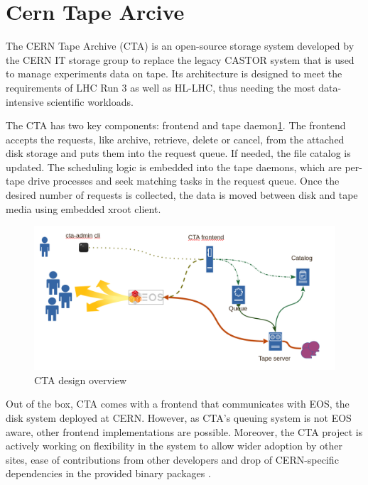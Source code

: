 \documentclass{webofc}
\begin{document}
\section{Cern Tape Arcive}
\label{sec:cta}

The CERN Tape Archive (CTA)\cite{cta} is an open-source storage system developed by the CERN IT storage group to
replace the legacy CASTOR system that is used to manage experiments data on tape. Its architecture is designed
to meet the requirements of LHC Run 3 as well as HL-LHC, thus needing the most data-intensive scientific workloads.

The CTA has two key components: frontend and tape daemon\ref{fig:cta_overview}. The frontend accepts the requests, like archive, retrieve, delete or cancel, from the attached disk storage and puts them into the request queue. If needed, the file catalog is updated. The scheduling logic is embedded into the tape daemons, which are per-tape drive processes and seek matching tasks in the request queue. Once the desired number of requests is collected, the data is moved between disk and tape media using embedded xroot\cite{xrootd} client.

\begin{figure}[h]
    \centering
    \includegraphics[scale=0.25]{cta-design.png}
    \caption{CTA design overview}
    \label{fig:cta_overview}
\end{figure}

Out of the box, CTA comes with a frontend that communicates with EOS, the disk system deployed at CERN. However, as CTA's queuing system is not EOS aware, other frontend implementations are possible. Moreover, the CTA project is actively working on flexibility in the system to allow wider adoption by other sites, ease of contributions from other developers and drop of CERN-specific dependencies in the provided binary packages \cite{cta_beyond_cern}.
\end{document}
